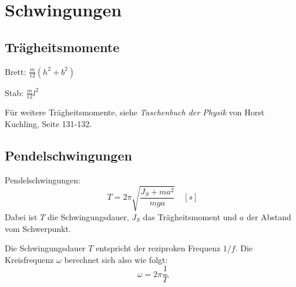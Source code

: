 \section{Schwingungen}

\subsection{Trägheitsmomente}

Brett: $\displaystyle\frac{m}{12} \left(h^2 + b^2\right)$

Stab: $\displaystyle\frac{m}{12} l^2$

Für weitere Trägheitsmomente, siehe \textit{Taschenbuch der Physik} von Horst
Kuchling, Seite 131-132.

\subsection{Pendelschwingungen}

Pendelschwingungen:
\[
	T = 2 \pi \sqrt{\frac{J_S + ma^2}{mga}}	
	\quad \left[ s \right]
\]
Dabei ist $T$ die Schwingungsdauer, $J_S$ das Trägheitsmoment und $a$ der
Abstand vom Schwerpunkt.

Die Schwingungsdauer $T$ entspricht der reziproken Frequenz $1/f$. Die
Kreisfrequenz $\omega$ berechnet sich also wie folgt:
\[
	\omega = 2\pi\frac{1}{T}
\]
